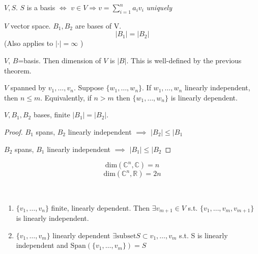 \begin{lemma} 
	$V,S$. $S$ is a basis $\Leftrightarrow$ $v\in V \Rightarrow v=\sum^n_{i=1} a_iv_i$ \textit{uniquely}
\end{lemma}

\begin{theorem} 
	$V$ vector space. $B_1,B_2$ are bases of V.
	\begin{equation} 
		|B_1|=|B_2|
	\end{equation}
	(Also applies to $|\cdot| = \infty$ )
\end{theorem}

\begin{definition} 
	$V$, $B$=basis. Then dimension of $V$ is $|B|$. This is well-defined by the previous theorem.
\end{definition}

\begin{theorem} 
	$V$ spanned by $v_1,\hdots,v_n$. Suppose $\{w_1,\hdots,w_n\}$. If $w_1,\hdots,w_n$ linearly independent, then $n\leq m$.
	Equivalently, if $n>m$ then $\{w_1,\hdots,w_n\}$ is linearly dependent.
\end{theorem}

\begin{theorem} 
	$V,B_1,B_2$ bases, finite $|B_1|=|B_2|$.
\end{theorem}

\begin{proof} 
	$B_1$ spans, $B_2$ linearly independent $\implies$ $|B_2|\leq |B_1$

	$B_2$ spans, $B_1$ linearly independent $\implies$ $|B_1|\leq |B_2$
\end{proof}

\[\mathrm{dim}(\mathbb{C}^n,\mathbb{C}) = n \]
\[\mathrm{dim}(\mathbb{C}^n,\mathbb{R}) = 2n \]


\begin{theorem} 
	\,
	\begin{enumerate} 
		\item $\{v_1,\hdots,v_n\}$ finite, linearly dependent. Then $\exists v_{m+1} \in V$ s.t. $\{v_1,\hdots,v_m,v_{m+1}\}$ is linearly independent.
		\item $\{v_1,\hdots,v_m\}$ linearly dependent $\exists \mathrm{subset} S \subset {v_1,\ldots,v_m}$ s.t. S is linearly independent and $\mathrm{Span}(\{v_1,\hdots,v_m\})=S$
	\end{enumerate}
\end{theorem}

